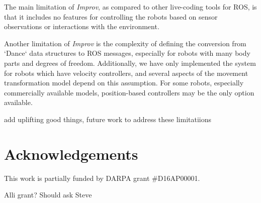 \documentclass[sigconf]{acmart}
\begin{document}
The main limitation of \emph{Improv}, as compared to other live-coding tools for
ROS, is that it includes no features for controlling the robots based on sensor
observations or interactions with the environment.

Another limitation of \emph{Improv} is the complexity of defining the conversion
from `Dance` data structures to ROS messages, especially for robots with many
body parts and degrees of freedom. Additionally, we have only implemented the
system for robots which have velocity controllers, and several aspects of the
movement transformation model depend on this assumption. For some robots,
especially commercially available models, position-based controllers may be the
only option available.

{\color{red}add uplifting good things, future work to address these limitatiions}

\section{Acknowledgements}

This work is partially funded by DARPA grant \#D16AP00001.

{\color{red} Alli grant? Should ask Steve}



\end{document}
